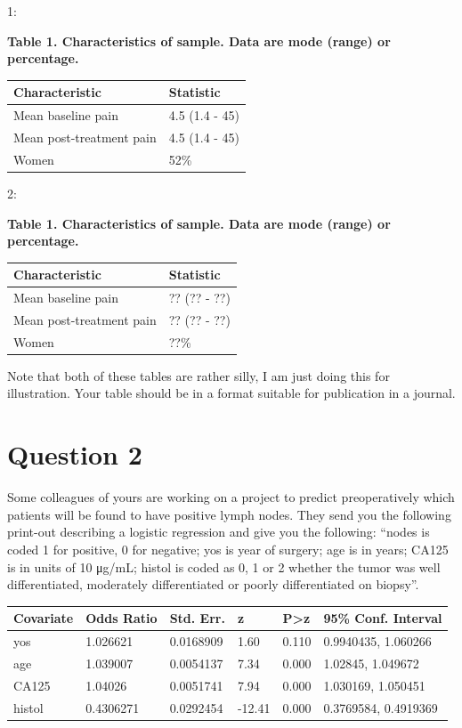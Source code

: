 \documentclass[]{book}
\begin{document}
1:

\textbf{Table 1. Characteristics of sample. Data are mode (range) or percentage.}

\captionsetup[table]{labelformat=empty,skip=1pt}
\begin{longtable}{ll}
\toprule
Characteristic & Statistic \\ 
\midrule
Mean baseline pain & 4.5 (1.4 - 45) \\ 
Mean post-treatment pain & 4.5 (1.4 - 45) \\ 
Women & 52\% \\ 
\bottomrule
\end{longtable}

2:

\textbf{Table 1. Characteristics of sample. Data are mode (range) or percentage.}

\captionsetup[table]{labelformat=empty,skip=1pt}
\begin{longtable}{ll}
\toprule
Characteristic & Statistic \\ 
\midrule
Mean baseline pain & ?? (?? - ??) \\ 
Mean post-treatment pain & ?? (?? - ??) \\ 
Women & ??\% \\ 
\bottomrule
\end{longtable}

Note that both of these tables are rather silly, I am just doing this for illustration. Your table should be in a format suitable for publication in a journal.

\hypertarget{question-2}{%
\section{Question 2}\label{question-2}}

Some colleagues of yours are working on a project to predict preoperatively which patients will be found to have positive lymph nodes. They send you the following print-out describing a logistic regression and give you the following: ``nodes is coded 1 for positive, 0 for negative; yos is year of surgery; age is in years; CA125 is in units of 10 μg/mL; histol is coded as 0, 1 or 2 whether the tumor was well differentiated, moderately differentiated or poorly differentiated on biopsy''.

\captionsetup[table]{labelformat=empty,skip=1pt}
\begin{longtable}{llllll}
\toprule
Covariate & Odds Ratio & Std. Err. & z & P>z & 95\% Conf. Interval \\ 
\midrule
yos & 1.026621 & 0.0168909 & 1.60 & 0.110 & 0.9940435, 1.060266 \\ 
age & 1.039007 & 0.0054137 & 7.34 & 0.000 & 1.02845, 1.049672 \\ 
CA125 & 1.04026 & 0.0051741 & 7.94 & 0.000 & 1.030169, 1.050451 \\ 
histol & 0.4306271 & 0.0292454 & -12.41 & 0.000 & 0.3769584, 0.4919369 \\ 
\bottomrule
\end{longtable}
\end{document}
